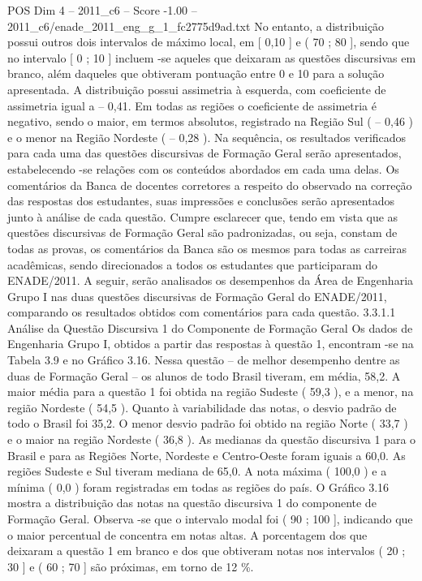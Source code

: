 \begin{textsample}{POS Dim 4 – 2011\_c6 – Score -1.00 – 2011\_c6/enade\_2011\_eng\_g\_1\_fc2775d9ad.txt}
No entanto, a distribuição possui outros dois intervalos de máximo local, em [ 0,10 ] e ( 70 ; 80 ], sendo que no intervalo [ 0 ; 10 ] incluem -se aqueles que deixaram as questões discursivas em branco, além daqueles que obtiveram pontuação entre 0 e 10 para a solução apresentada.
A distribuição possui assimetria à esquerda, com coeficiente de assimetria igual a – 0,41.
Em todas as regiões o coeficiente de assimetria é negativo, sendo o maior, em termos absolutos, registrado na Região Sul ( – 0,46 ) e o menor na Região Nordeste ( – 0,28 ).
Na sequência, os resultados verificados para cada uma das questões discursivas de Formação Geral serão apresentados, estabelecendo -se relações com os conteúdos abordados em cada uma delas.
Os comentários da Banca de docentes corretores a respeito do observado na correção das respostas dos estudantes, suas impressões e conclusões serão apresentados junto à análise de cada questão.
Cumpre esclarecer que, tendo em vista que as questões discursivas de Formação Geral são padronizadas, ou seja, constam de todas as provas, os comentários da Banca são os mesmos para todas as carreiras acadêmicas, sendo direcionados a todos os estudantes que participaram do ENADE/2011.
A seguir, serão analisados os desempenhos da Área de Engenharia Grupo I nas duas questões discursivas de Formação Geral do ENADE/2011, comparando os resultados obtidos com comentários para cada questão. 3.3.1.1 Análise da Questão Discursiva 1 do Componente de Formação Geral Os dados de Engenharia Grupo I, obtidos a partir das respostas à questão 1, encontram -se na Tabela 3.9 e no Gráfico 3.16.
Nessa questão – de melhor desempenho dentre as duas de Formação Geral – os alunos de todo Brasil tiveram, em média, 58,2.
A maior média para a questão 1 foi obtida na região Sudeste ( 59,3 ), e a menor, na região Nordeste ( 54,5 ).
Quanto à variabilidade das notas, o desvio padrão de todo o Brasil foi 35,2.
O menor desvio padrão foi obtido na região Norte ( 33,7 ) e o maior na região Nordeste ( 36,8 ).
As medianas da questão discursiva 1 para o Brasil e para as Regiões Norte, Nordeste e Centro-Oeste foram iguais a 60,0.
As regiões Sudeste e Sul tiveram mediana de 65,0.
A nota máxima ( 100,0 ) e a mínima ( 0,0 ) foram registradas em todas as regiões do país.
O Gráfico 3.16 mostra a distribuição das notas na questão discursiva 1 do componente de Formação Geral.
Observa -se que o intervalo modal foi ( 90 ; 100 ], indicando que o maior percentual de concentra em notas altas.
A porcentagem dos que deixaram a questão 1 em branco e dos que obtiveram notas nos intervalos ( 20 ; 30 ] e ( 60 ; 70 ] são próximas, em torno de 12 \%.

\end{textsample}

